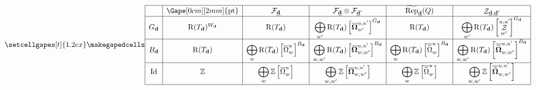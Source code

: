 \documentclass[border={7pt 0pt 130pt 0pt},varwidth]{standalone}
\DeclareMathOperator{\Id}{\operatorname{Id}}
\DeclareMathOperator{\RRep}{\widetilde{\operatorname{Rep}}}
\DeclareMathOperator{\pt}{\operatorname{pt}}
\DeclareMathOperator{\Rpt}{\operatorname{R}}
\DeclareMathOperator{\St}{\mathcal{Z}}
\newcommand{\dimvec}[1]{\mathbf{#1}}
\newcommand{\ftdimvec}[1]{\underline{\dimvec{#1}}}
\newcommand{\Wd}{W_{\dimvec{d}}}
\newcommand{\Omcell}{\Omega}
\newcommand{\OOmcell}{\boldsymbol{\Omega}}
\newcommand{\preimage}[1]{\widetilde{#1}}
\begin{document}
\begin{table}[]
\[
 \setcellgapes[t]{1.2ex}\makegapedcells
\centering
\begin{array}{|c|c|c|c|c|c|}
\hline
      & \Gape[0cm][2mm]{\pt}         & \mathcal{F}_{\ftdimvec{d}}                                                    & \mathcal{F}_{\ftdimvec{d}} \otimes \mathcal{F}_{\ftdimvec{d}'}                &\RRep_{\ftdimvec{d}}(Q)&   \St_{\ftdimvec{d},\ftdimvec{d}'}                      \\
       \hline
G_{\dimvec{d}} & \Rpt(T_{\dimvec{d}})^{\Wd} & \Rpt(T_{\dimvec{d}})                                                        & \displaystyle\bigoplus_{w'} \Rpt(T_{\dimvec{d}})  \left[ \overline{\OOmcell}_{w'}^{u,u'} \right]^{G_{\dimvec{d}}}
& \Rpt(T_{\dimvec{d}})                                                        & \displaystyle\bigoplus_{w'} \Rpt(T_{\dimvec{d}})  \left[ \St_{w'}^{u,u'} \right]^{G_{\dimvec{d}}} \\ \hline
{B_{\dimvec{d}}}     & \Rpt(T_{\dimvec{d}})     & \displaystyle\bigoplus_{w} \Rpt(T_{\dimvec{d}}) \left[ \overline{\Omcell}_{w}^{u} \right]^{B_{\dimvec{d}}}  & \displaystyle\bigoplus_{w,w'} \Rpt(T_{\dimvec{d}}) \left[ \overline{\OOmcell}_{w,w'}^{u,u'} \right]^{B_{\dimvec{d}}}
& \displaystyle\bigoplus_{w} \Rpt(T_{\dimvec{d}}) \left[ \overline{\preimage{\Omcell}}_{w}^{u} \right]^{B_{\dimvec{d}}}  & \displaystyle\bigoplus_{w,w'} \Rpt(T_{\dimvec{d}}) \left[ \overline{\preimage{\OOmcell}}_{w,w'}^{u,u'} \right]^{B_{\dimvec{d}}}    \\ \hline
\Id   & \mathbb{Z}  & \displaystyle\bigoplus_{w} \mathbb{Z} \left[ \overline{\Omcell}_{w}^{u} \right] & \displaystyle\bigoplus_{w,w'} \mathbb{Z} \left[ \overline{\OOmcell}_{w,w'}^{u,u'} \right]
& \displaystyle\bigoplus_{w} \mathbb{Z} \left[ \overline{\preimage{\Omcell}}_{w}^{u} \right] & \displaystyle\bigoplus_{w,w'} \mathbb{Z} \left[ \overline{\preimage{\OOmcell}}_{w,w'}^{u,u'} \right]   \\ \hline
\end{array}
\]
\end{table}
\end{document}
